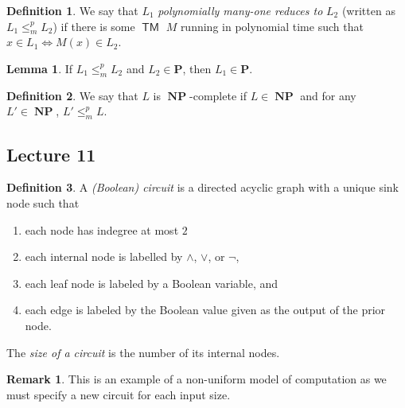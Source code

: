 \documentclass[10pt,letterpaper,cm]{nupset}
\theoremstyle{definition}
\newtheorem*{definition}{Definition}
\newtheorem{remark}{Remark}
\newtheorem{lemma}{Lemma}
\newcommand{\1}{\mathbf{1}}
\newcommand{\0}{\vec 0}
\DeclareMathOperator{\TM}{\mathsf{TM}}
\DeclareMathOperator{\NP}{\mathbf{NP}}
\begin{document}
\begin{definition}
We say that $L_1$ \textit{polynomially many-one reduces to} $L_2$ (written as $L_1 \leq_m^p L_2$) if there is some $\TM$ $M$ running in polynomial time such that $x \in L_1 \iff M(x) \in L_2$.
\end{definition}

\begin{lemma}
If $L_1 \leq_m^p L_2$ and $L_2 \in \mathbf{P}$, then $L_1 \in \mathbf{P}$.
\end{lemma}

\begin{definition}
We say that $L$ is $\NP$-complete if $L \in \NP$ and for any $L' \in \NP$, $L' \leq_m^p L$. 
\end{definition}

\subsection{Lecture 11}

\begin{definition}
A \textit{(Boolean) circuit} is a directed acyclic graph with a unique sink node such that 
\begin{enumerate} 
\item each node has indegree at most $2$
\item each internal node is labelled by $ \land$, $\vee$, or $\neg$,
\item each leaf  node is labeled by a Boolean variable, and
\item each edge is labeled by the Boolean value given as the output of the prior node. 
\end{enumerate}
The \textit{size of a circuit} is the number of its internal nodes.
\end{definition}

\begin{remark}
This is an example of a non-uniform model of computation as we must specify a new circuit for each input size. 
\end{remark}
\end{document}
